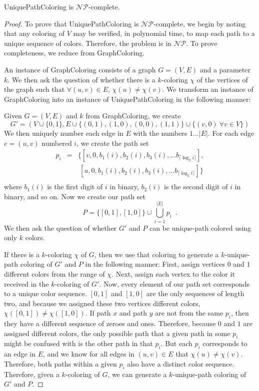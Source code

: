 \documentclass[runningheads]{llncs}
\newcommand{\NP}{\ensuremath{\mathcal{NP}}}
\begin{document}
\begin{theorem}{\sc UniquePathColoring} is \NP-complete.\end{theorem}
\begin{proof}
To prove that {\sc UniquePathColoring} is \NP-complete, we begin by noting that
any coloring of $V$ may be verified, in polynomial time, to map each path to a
unique sequence of colors.  Therefore, the problem is in \NP.  To prove
completeness, we reduce from {\sc GraphColoring}\cite{gandj}.

An instance of {\sc GraphColoring } consists of a graph $G=(V,E)$ and a
parameter $k$.  We then ask the question of whether there is a $k$-coloring
$\chi$ of the vertices of the graph such that $\forall (u,v)\in E$, $\chi(u)
\neq \chi(v)$.  We transform an instance of {\sc GraphColoring} into an
instance of {\sc UniquePathColoring} in the following manner:

Given $G=(V,E)$ and $k$ from {\sc GraphColoring}, we create $$G'=\left(V \cup
\{0,1\}, E \cup \{(0,1), (1,0), (0,0), (1,1)\} \cup \{ (v, 0)~ \forall v \in V\} \right)$$ We then
uniquely number each edge in $E$ with the numbers $1 \ldots |E|$.  For each
edge $e = (u,v)$ numbered $i$, we create the path set 
\begin{eqnarray*}
p_i &=& \{[v,0,b_1(i),b_2(i), b_3(i), \ldots b_{\lceil \log_2 i\rceil}], \\
    & &  ~[u, 0,b_1(i),b_2(i), b_3(i), \ldots b_{\lceil \log_2 i\rceil}]\} \\
\end{eqnarray*}
where $b_1(i)$ is the first digit of $i$ in binary, $b_2(i)$ is the second
digit of $i$ in binary, and so on.  Now we create our path set $$P = \{ [0,1],
[1,0] \} \cup \bigcup_{i = 1}^{|E|} p_i \enspace .$$ We then ask the question
of whether $G'$ and $P$ can be unique-path colored using only $k$ colors.

If there is a $k$-coloring $\chi$ of $G$, then we use that coloring to generate
a $k$-unique-path coloring of $G'$ and $P$ in the following manner: First,
assign vertices $0$ and $1$ different colors from the range of $\chi$.  Next,
assign each vertex to the color it received in the $k$-coloring of $G'$.  Now,
every element of our path set corresponds to a unique color sequence.  $[0,1]$
and $[1,0]$ are the only sequences of length two, and because we assigned these
two vertices different colors, $\chi([0,1]) \neq \chi([1,0])$.  If path $x$ and
path $y$ are not from the same $p_i$, then they have a different sequence of
zeroes and ones.  Therefore, because $0$ and $1$ are assigned different colors,
the only possible path that a given path in some $p_i$ might be confused with
is the other path in that $p_i$.  But each $p_i$ corresponds to an edge in
$E$, and we know for all edges in $(u,v) \in E$ that $\chi(u) \neq \chi(v)$.
Therefore, both paths within a given $p_i$ also have a distinct color sequence.
Therefore, given a $k$-coloring of $G$, we can generate a $k$-unique-path
coloring of $G'$ and $P$.


\end{proof}
\end{document}
